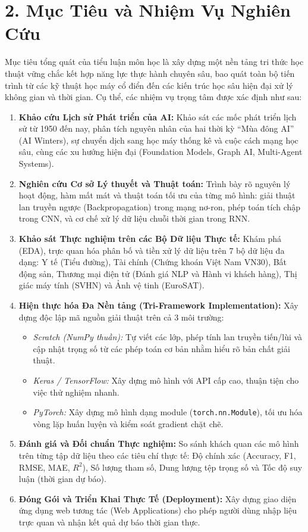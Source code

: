\documentclass[12pt,a4paper]{report}
\begin{document}
\section*{2. Mục Tiêu và Nhiệm Vụ Nghiên Cứu}

Mục tiêu tổng quát của tiểu luận môn học là xây dựng một nền tảng tri thức học thuật vững chắc kết hợp năng lực thực hành chuyên sâu, bao quát toàn bộ tiến trình từ các kỹ thuật học máy cổ điển đến các kiến trúc học sâu hiện đại xử lý không gian và thời gian. Cụ thể, các nhiệm vụ trọng tâm được xác định như sau:
\begin{enumerate}[leftmargin=1.2cm, label={\textbf{Nhiệm vụ \arabic*:}}]
    \item \textbf{Khảo cứu Lịch sử Phát triển của AI:} Khảo sát các mốc phát triển lịch sử từ 1950 đến nay, phân tích nguyên nhân của hai thời kỳ “Mùa đông AI” (AI Winters), sự chuyển dịch sang học máy thống kê và cuộc cách mạng học sâu, cùng các xu hướng hiện đại (Foundation Models, Graph AI, Multi-Agent Systems).
    \item \textbf{Nghiên cứu Cơ sở Lý thuyết và Thuật toán:} Trình bày rõ nguyên lý hoạt động, hàm mất mát và thuật toán tối ưu của từng mô hình: giải thuật lan truyền ngược (Backpropagation) trong mạng nơ-ron, phép toán tích chập trong CNN, và cơ chế xử lý dữ liệu chuỗi thời gian trong RNN.
    \item \textbf{Khảo sát Thực nghiệm trên các Bộ Dữ liệu Thực tế:} Khám phá (EDA), trực quan hóa phân bố và tiền xử lý dữ liệu trên 7 bộ dữ liệu đa dạng: Y tế (Tiểu đường), Tài chính (Chứng khoán Việt Nam VN30), Bất động sản, Thương mại điện tử (Đánh giá NLP và Hành vi khách hàng), Thị giác máy tính (SVHN) và Ảnh vệ tinh (EuroSAT).
    \item \textbf{Hiện thực hóa Đa Nền tảng (Tri-Framework Implementation):} Xây dựng độc lập mã nguồn giải thuật trên cả 3 môi trường:
    \begin{itemize}
        \item \textit{Scratch (NumPy thuần):} Tự viết các lớp, phép tính lan truyền tiến/lùi và cập nhật trọng số từ các phép toán cơ bản nhằm hiểu rõ bản chất giải thuật.
        \item \textit{Keras / TensorFlow:} Xây dựng mô hình với API cấp cao, thuận tiện cho việc thử nghiệm nhanh.
        \item \textit{PyTorch:} Xây dựng mô hình dạng module (\texttt{torch.nn.Module}), tối ưu hóa vòng lặp huấn luyện và kiểm soát gradient chặt chẽ.
    \end{itemize}
    \item \textbf{Đánh giá và Đối chuẩn Thực nghiệm:} So sánh khách quan các mô hình trên từng tập dữ liệu theo các tiêu chí thực tế: Độ chính xác (Accuracy, F1, RMSE, MAE, $R^2$), Số lượng tham số, Dung lượng tệp trọng số và Tốc độ suy luận (thời gian dự báo).
    \item \textbf{Đóng Gói và Triển Khai Thực Tế (Deployment):} Xây dựng giao diện ứng dụng web tương tác (Web Applications) cho phép người dùng nhập liệu trực quan và nhận kết quả dự báo thời gian thực.
\end{enumerate}
\end{document}
